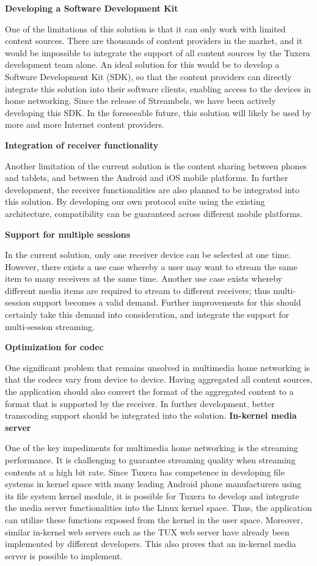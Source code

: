 \textbf{Developing a Software Development Kit}

One of the limitations of this solution is that it can only work with limited
content sources. There are thousands of content providers in the market, and it
would be impossible to integrate the support of all content sources by the
Tuxera development team alone. An ideal solution for this would be to develop a
Software Development Kit (SDK), so that the content providers can directly
integrate this solution into their software clients, enabling access to the
devices in home networking. Since the release of Streambels, we have been
actively developing this SDK. In the foreseeable future, this solution will
likely be used by more and more Internet content providers.

\textbf{Integration of receiver functionality}

Another limitation of the current solution is the content sharing between
phones and tablets, and between the Android and iOS mobile platforms.
In further development, the receiver functionalities are also planned to be
integrated into this solution. By developing our own protocol suite using
the existing architecture, compatibility can be guaranteed across different
mobile platforms.

\textbf{Support for multiple sessions}

In the current solution, only one receiver device can be selected at one
time. However, there exists a use case whereby a user may want to stream the
same item to many receivers at the same time. Another use case exists
whereby different media items are required to stream to different receivers;
thus multi-session support becomes a valid demand. Further improvements
for this should certainly take this demand into consideration, and integrate the
support for multi-session streaming.

\textbf{Optimization for codec}

One significant problem that remains unsolved in multimedia home networking is
that the codecs vary from device to device. Having aggregated all content
sources, the application should also convert the format of the aggregated
content to a format that is supported by the receiver. In further development,
better transcoding support should be integrated into the solution.
\clearpage
\textbf{In-kernel media server}

One of the key impediments for multimedia home networking is the streaming
performance. It is challenging to guarantee streaming quality when streaming
contents at a high bit rate. Since Tuxera has competence in developing file
systems in kernel space with many leading Android phone manufacturers using its
file system kernel module, it is possible for Tuxera to develop and integrate
the media server functionalities into the Linux kernel space. Thus, the
application can utilize these functions exposed from the kernel in the user
space. Moreover, similar in-kernel web servers such as the TUX web server
\cite{tux_webserver} have already been implemented by different developers.
This also proves that an in-kernel media server is possible to implement.
